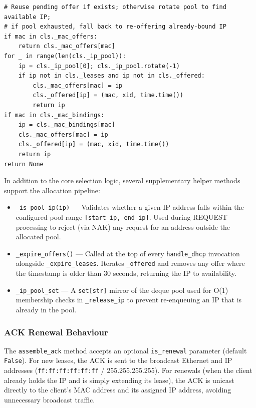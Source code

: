 \documentclass[12pt,a4paper]{article}
\begin{document}
\begin{lstlisting}[caption={IP Selection with Duplicate Prevention}]
# Reuse pending offer if exists; otherwise rotate pool to find available IP;
# if pool exhausted, fall back to re-offering already-bound IP
if mac in cls._mac_offers:
    return cls._mac_offers[mac]
for _ in range(len(cls._ip_pool)):
    ip = cls._ip_pool[0]; cls._ip_pool.rotate(-1)
    if ip not in cls._leases and ip not in cls._offered:
        cls._mac_offers[mac] = ip
        cls._offered[ip] = (mac, xid, time.time())
        return ip
if mac in cls._mac_bindings:
    ip = cls._mac_bindings[mac]
    cls._mac_offers[mac] = ip
    cls._offered[ip] = (mac, xid, time.time())
    return ip
return None
\end{lstlisting}

In addition to the core selection logic, several supplementary helper methods support the allocation pipeline:

\begin{itemize}[leftmargin=1.5cm]
    \item \texttt{\_is\_pool\_ip(ip)} --- Validates whether a given IP address falls within the configured pool range \texttt{[start\_ip, end\_ip]}. Used during REQUEST processing to reject (via NAK) any request for an address outside the allocated pool.
    \item \texttt{\_expire\_offers()} --- Called at the top of every \texttt{handle\_dhcp} invocation alongside \texttt{\_expire\_leases}. Iterates \texttt{\_offered} and removes any offer where the timestamp is older than 30 seconds, returning the IP to availability.
    \item \texttt{\_ip\_pool\_set} --- A \texttt{set[str]} mirror of the deque pool used for O(1) membership checks in \texttt{\_release\_ip} to prevent re-enqueuing an IP that is already in the pool.
\end{itemize}

\subsubsection{ACK Renewal Behaviour}

The \texttt{assemble\_ack} method accepts an optional \texttt{is\_renewal} parameter (default \texttt{False}). For new leases, the ACK is sent to the broadcast Ethernet and IP addresses (\texttt{ff:ff:ff:ff:ff:ff} / 255.255.255.255). For renewals (when the client already holds the IP and is simply extending its lease), the ACK is unicast directly to the client's MAC address and its assigned IP address, avoiding unnecessary broadcast traffic.
\end{document}
